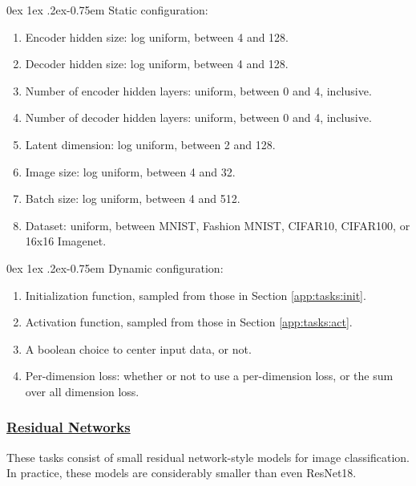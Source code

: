 \documentclass[11pt]{article}
\makeatletter
\renewcommand{\paragraph}{%
  \@startsection{paragraph}{4}%
  {\z@}{0ex \@plus 1ex \@minus .2ex}{-0.75em}%
  {\normalfont\normalsize\bfseries}%
}
\makeatother
\begin{document}
\paragraph{Static configuration:}
\begin{enumerate}
    \item Encoder hidden size: log uniform, between 4 and 128.
    \item Decoder hidden size: log uniform, between 4 and 128.
    \item Number of encoder hidden layers: uniform, between 0 and 4, inclusive.
    \item Number of decoder hidden layers: uniform, between 0 and 4, inclusive.
    \item Latent dimension: log uniform, between 2 and 128.
    \item Image size: log uniform, between 4 and 32.
    \item Batch size: log uniform, between 4 and 512.
    \item Dataset: uniform, between MNIST, Fashion MNIST, CIFAR10, CIFAR100, or 16x16 Imagenet.
\end{enumerate}

\paragraph{Dynamic configuration:}
\begin{enumerate}
    \item Initialization function, sampled from those in Section \ref{app:tasks:init}.
    \item Activation function, sampled from those in Section \ref{app:tasks:act}.
    \item A boolean choice to center input data, or not.
    \item Per-dimension loss: whether or not to use a per-dimension loss, or the sum over all dimension loss.
\end{enumerate}


\subsubsection{\href{https://github.com/google/learned_optimization/blob/4447601601f04e3dc7b1aecd7854d44526593752/learned_optimization/tasks/parametric/image_resnet.py}{Residual Networks}}
These tasks consist of small residual network-style \citep{he2016deep} models for image classification. In practice, these models are considerably smaller than even ResNet18.
\end{document}
